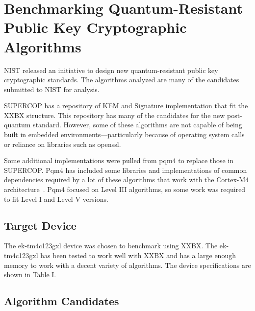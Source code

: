 \documentclass[10pt]{article}
\begin{document}
\section{Benchmarking Quantum-Resistant Public Key Cryptographic Algorithms}

NIST released an initiative to design new quantum-resistant public key cryptographic 
standards. The algorithms analyzed are many of the candidates submitted to NIST for 
analysis. %

SUPERCOP has a repository of KEM and Signature implementation that fit the XXBX structure. 
This repository has many of the candidates for the new post-quantum standard. 
However, some of these algorithms are not capable of being built in embedded 
environments—particularly because of operating system calls or reliance on 
libraries such as openssl.

Some additional implementations were pulled from pqm4 to replace those in SUPERCOP. 
Pqm4 has included some libraries and implementations of common dependencies required by 
a lot of these algorithms that work with the Cortex-M4 architecture~\cite{PQM4}. Pqm4 focused on 
Level III algorithms, so some work was required to fit Level I and Level V versions. 


\subsection{Target Device}

The ek-tm4c123gxl device was chosen to benchmark using XXBX. 
The ek-tm4c123gxl has been tested to work well with XXBX and has a large enough memory 
to work with a decent variety of algorithms. The device specifications are shown in Table I.

\subsection{Algorithm Candidates}
\end{document}
